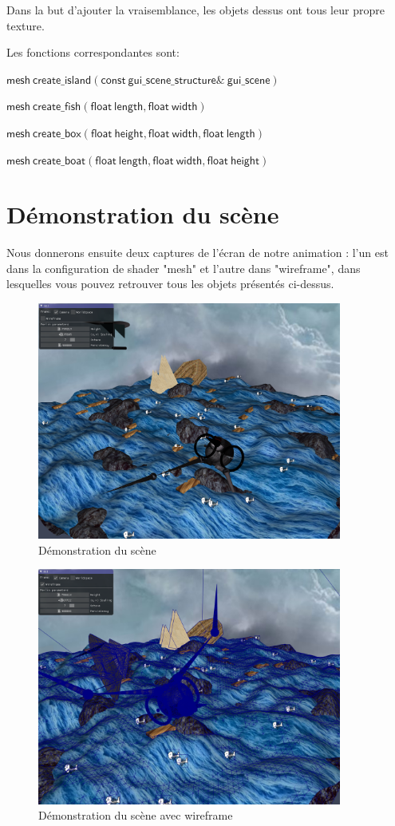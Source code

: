 \documentclass[utf8, a4paper, 12pt]{article}
\begin{document}
Dans la but d'ajouter la vraisemblance, les objets dessus ont tous leur propre texture.

Les fonctions correspondantes sont:

$\mathsf{mesh\ create\_island(const\ gui\_scene\_structure\&\  gui\_scene)}$

$\mathsf{mesh\ create\_fish(float\ length, float\ width)}$

$\mathsf{mesh\ create\_box(float\ height, float\ width, float\ length)}$

$\mathsf{mesh\ create\_boat(float\ length, float\ width, float\ height)}$

\section{Démonstration du scène}

Nous donnerons ensuite deux captures de l'écran de notre animation : l'un est dans la configuration de shader "mesh" et l'autre dans "wireframe", dans lesquelles vous pouvez retrouver tous les objets présentés ci-dessus.

\begin{figure}[htbp]
\centering
\includegraphics[width=10cm]{screenshot.png}
\caption{Démonstration du scène}
\end{figure}

\begin{figure}[htbp]
\centering
\includegraphics[width=10cm]{screenshot1.png}
\caption{Démonstration du scène avec wireframe}
\end{figure}
\end{document}
